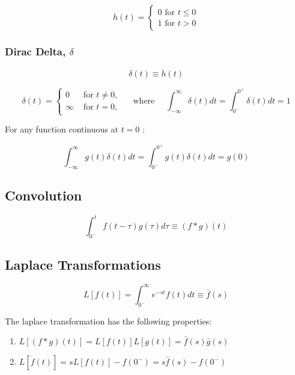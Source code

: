 \[h(t)=\left\{\begin{array}{l}{0 \text { for } t \leq 0} \\ {1 \text { for } t>0}\end{array}\right.\]

\hypertarget{dirac-delta-delta}{%
\subsubsection{\texorpdfstring{Dirac Delta,
\(\delta\)}{Dirac Delta, \textbackslash delta}}\label{dirac-delta-delta}}

\[\delta(t) \equiv \dot{h}(t)\]

\[\delta(t)=\left\{\begin{array}{ll}{0} & {\text { for } t \neq 0,} \\ {\infty} & {\text { for } t=0,}\end{array} \quad \text { where } \quad \int_{-\infty}^{\infty} \delta(t) d t=\int_{0^{-}}^{0^{+}} \delta(t) d t=1\right.\]

For any function continuous at \(t=0\) :

\[\int_{-\infty}^{\infty} g(t) \delta(t) d t=\int_{0^{-}}^{0^{+}} g(t) \delta(t) d t=g(0)\]

\hypertarget{convolution}{%
\subsection{Convolution}\label{convolution}}

\[
\int_{0^{-}}^{t} f(t-\tau) g(\tau) d \tau \equiv(f * g)(t)
\]

\hypertarget{laplace-transformations}{%
\subsection{Laplace Transformations}\label{laplace-transformations}}

\[
L[f(t)]=\int_{0^{-}}^{\infty} e^{-s t} f(t) d t \equiv \bar{f}(s)
\]

The laplace transformation has the following properties:

\begin{enumerate}
\def\labelenumi{\arabic{enumi}.}
\item
  \(L[(f * g)(t)]=L[f(t)] L[g(t)]=\bar{f}(s) \bar{g}(s)\)
\item
  \(L[\dot{f}(t)]=s L[f(t)]-f\left(0^{-}\right)=s \bar{f}(s)-f\left(0^{-}\right)\)
\end{enumerate}
